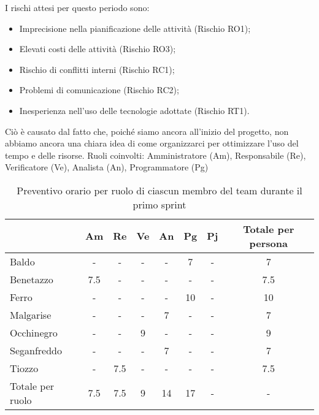 I rischi attesi per questo periodo sono:
\begin{itemize}
    \item Imprecisione nella pianificazione delle attività (Rischio RO1);
    \item Elevati costi delle attività (Rischio RO3);
    \item Rischio di conflitti interni (Rischio RC1);
    \item Problemi di comunicazione (Rischio RC2);
    \item Inesperienza nell'uso delle tecnologie adottate (Rischio RT1).
\end{itemize}
Ciò è causato dal fatto che, poiché siamo ancora all'inizio del progetto, non abbiamo ancora una chiara idea di come organizzarci per ottimizzare l'uso del tempo e delle risorse.
\newpage
{}
Ruoli coinvolti: Amministratore (Am), Responsabile (Re), Verificatore (Ve), Analista (An), Programmatore (Pg)
\begin{table}[!h]
    \centering
    \begin{tabular}{ | l | c | c | c | c | c | c | c | } 
        \hline
        \textbf{} & \textbf{Am} & \textbf{Re} & \textbf{Ve} &\textbf{An} & \textbf{Pg} & \textbf{Pj} & \textbf{Totale per persona} \\
        \hline 
        Baldo            &  -   &  -   &  -   &  -   &  7   &  -   &  7   \\ 
        Benetazzo        &  7.5 &  -   &  -   &  -   &  -   &  -   &  7.5 \\ 
        Ferro            &  -   &  -   &  -   &  -   & 10   &  -   & 10   \\ 
        Malgarise        &  -   &  -   &  -   &  7   &  -   &  -   &  7   \\ 
        Occhinegro       &  -   &  -   &  9   &  -   &  -   &  -   &  9   \\ 
        Seganfreddo      &  -   &  -   &  -   &  7   &  -   &  -   &  7   \\
        Tiozzo           &  -   &  7.5 &  -   &  -   &  -   &  -   &  7.5 \\ 
        \hline
        Totale per ruolo &  7.5 &  7.5 &  9   & 14   & 17   &  -   &  -   \\
        \hline
    \end{tabular}
    \caption{Preventivo orario per ruolo di ciascun membro del team durante il primo sprint}
    \label{tab:1}
\end{table}

